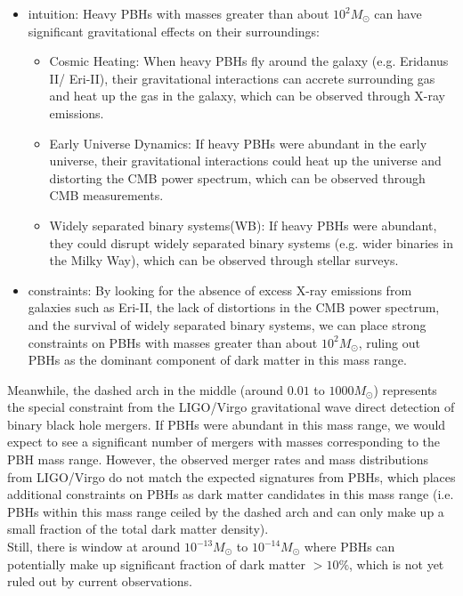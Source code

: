 \begin{extra}
\begin{itemize}
        \begin{itemize}
            \item intuition: Heavy PBHs with masses greater than about $10^2 M_\odot$ can have significant gravitational effects on their surroundings:
            \begin{itemize}
                \item Cosmic Heating: When heavy PBHs fly around the galaxy (e.g. Eridanus II/ Eri-II), their gravitational interactions can accrete surrounding gas and heat up the gas in the galaxy, which can be observed through X-ray emissions. 
                \item Early Universe Dynamics: If heavy PBHs were abundant in the early universe, their gravitational interactions could heat up the universe and distorting the CMB power spectrum, which can be observed through CMB measurements.
                \item Widely separated binary systems(WB): If heavy PBHs were abundant, they could disrupt widely separated binary systems (e.g. wider binaries in the Milky Way), which can be observed through stellar surveys.
            \end{itemize}
            \item constraints: 
                By looking for the absence of excess X-ray emissions from galaxies such as Eri-II, the lack of distortions in the CMB power spectrum, and the survival of widely separated binary systems, we can place strong constraints on PBHs with masses greater than about $10^2 M_\odot$, ruling out PBHs as the dominant component of dark matter in this mass range.
        \end{itemize}
    \end{itemize}

    Meanwhile, the dashed arch in the middle (around $0.01$ to $1000 M_\odot$) represents the special constraint from the LIGO/Virgo gravitational wave direct detection of binary black hole mergers. If PBHs were abundant in this mass range, we would expect to see a significant number of mergers with masses corresponding to the PBH mass range. However, the observed merger rates and mass distributions from LIGO/Virgo do not match the expected signatures from PBHs, which places additional constraints on PBHs as dark matter candidates in this mass range (i.e. PBHs within this mass range ceiled by the dashed arch and can only make up a small fraction of the total dark matter density). \\

    Still, there is window at around $10^{-13} M_\odot$ to $10^{-14} M_\odot$ where PBHs can potentially make up significant fraction of dark matter $> 10\%$, which is not yet ruled out by current observations.
\end{extra}